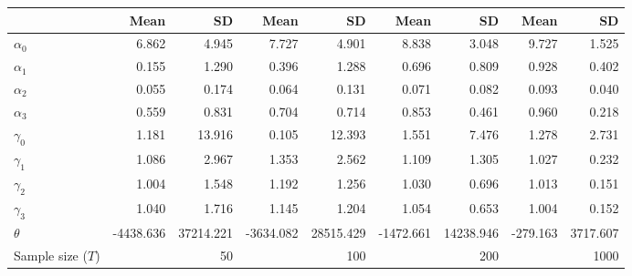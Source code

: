 
\begin{tabular}[t]{lrrrrrrrr}
\toprule
  & Mean & SD & Mean  & SD  & Mean   & SD   & Mean    & SD   \\
\midrule
$\alpha_{0}$ & 6.862 & 4.945 & 7.727 & 4.901 & 8.838 & 3.048 & 9.727 & 1.525\\
$\alpha_{1}$ & 0.155 & 1.290 & 0.396 & 1.288 & 0.696 & 0.809 & 0.928 & 0.402\\
$\alpha_{2}$ & 0.055 & 0.174 & 0.064 & 0.131 & 0.071 & 0.082 & 0.093 & 0.040\\
$\alpha_{3}$ & 0.559 & 0.831 & 0.704 & 0.714 & 0.853 & 0.461 & 0.960 & 0.218\\
$\gamma_{0}$ & 1.181 & 13.916 & 0.105 & 12.393 & 1.551 & 7.476 & 1.278 & 2.731\\
$\gamma_{1}$ & 1.086 & 2.967 & 1.353 & 2.562 & 1.109 & 1.305 & 1.027 & 0.232\\
$\gamma_{2}$ & 1.004 & 1.548 & 1.192 & 1.256 & 1.030 & 0.696 & 1.013 & 0.151\\
$\gamma_{3}$ & 1.040 & 1.716 & 1.145 & 1.204 & 1.054 & 0.653 & 1.004 & 0.152\\
$\theta$ & -4438.636 & 37214.221 & -3634.082 & 28515.429 & -1472.661 & 14238.946 & -279.163 & 3717.607\\
Sample size ($T$) &  & 50 &  & 100 &  & 200 &  & 1000\\
\bottomrule
\end{tabular}
